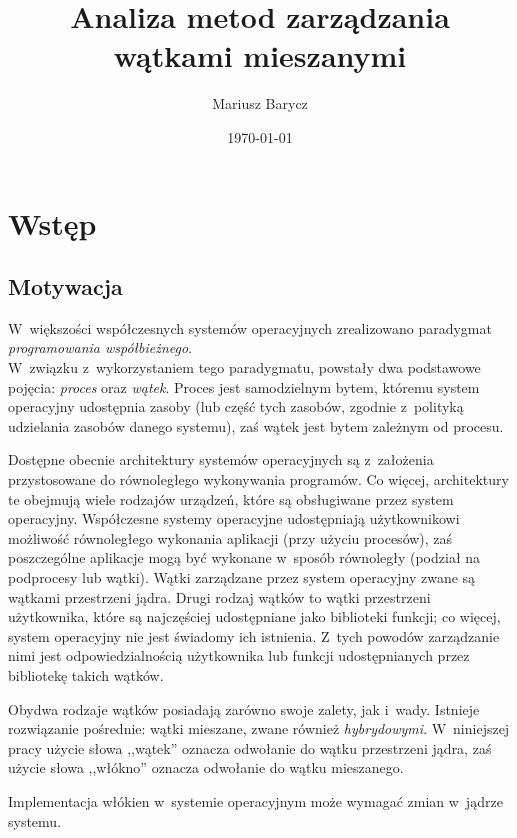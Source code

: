 \documentclass[12pt]{mwart}
\author{Mariusz Barycz}
\title{Analiza metod zarządzania wątkami mieszanymi}
\date{\today}
\begin{document}
 


\maketitle
\thispagestyle{empty}

\newpage
\tableofcontents
\thispagestyle{empty}
\newpage

\section{Wstęp}
%
\subsection{Motywacja}
\indent
  W~większości współczesnych systemów operacyjnych zrealizowano paradygmat \emph{programowania współbieżnego}.\\
  W~związku z~wykorzystaniem tego paradygmatu, powstały dwa podstawowe pojęcia: \emph{proces} oraz \emph{wątek}.
  Proces jest samodzielnym bytem, któremu system operacyjny udostępnia zasoby (lub część tych zasobów, zgodnie z~polityką udzielania zasobów
  danego systemu), zaś wątek jest bytem zależnym od procesu.
\par
%
\indent
	Dostępne obecnie architektury systemów operacyjnych są z~założenia przystosowane do równoległego
	wykonywania programów. Co więcej, architektury te obejmują wiele rodzajów urządzeń, które są obsługiwane przez system operacyjny.
	Współczesne systemy operacyjne udostępniają użytkownikowi możliwość równoległego wykonania aplikacji (przy użyciu procesów),
	zaś poszczególne aplikacje mogą być wykonane w~sposób równoległy (podział na podprocesy lub wątki). Wątki zarządzane przez system operacyjny
	zwane są wątkami przestrzeni jądra.
	Drugi rodzaj wątków to wątki przestrzeni użytkownika, które są najczęściej udostępniane jako biblioteki funkcji; co więcej, system operacyjny
	nie jest świadomy ich istnienia. Z~tych powodów zarządzanie nimi jest odpowiedzialnością użytkownika lub funkcji udostępnianych przez
	bibliotekę takich wątków.
\par
%
\indent
	Obydwa rodzaje wątków posiadają zarówno swoje zalety, jak i~wady. Istnieje rozwiązanie pośrednie: wątki mieszane, zwane również
	\emph{hybrydowymi}. W~niniejszej pracy użycie słowa ,,wątek'' oznacza odwołanie do wątku przestrzeni jądra, zaś użycie słowa ,,włókno'' oznacza odwołanie
  do wątku mieszanego.
\par
%
\indent
  Implementacja włókien w~systemie operacyjnym może wymagać zmian w~jądrze systemu.
\end{document}
